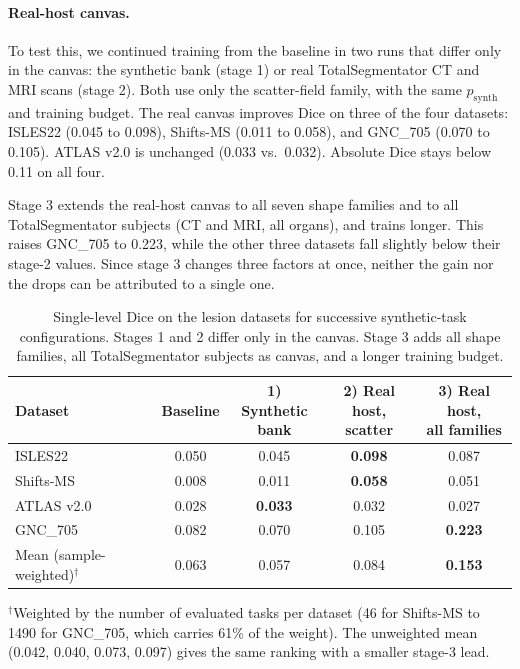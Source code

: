 \documentclass[hidelinks, a4paper, 12pt, ngerman, english]{article}  %
\begin{document}
\paragraph{Real-host canvas.}
To test this, we continued training from the baseline in two runs that differ
only in the canvas: the synthetic bank (stage 1) or real TotalSegmentator
CT and MRI scans (stage 2). Both use only the scatter-field family, with the same
$p_\text{synth}$ and training budget. The real canvas improves Dice on three of
the four datasets: ISLES22 (0.045 to 0.098), Shifts-MS (0.011 to 0.058), and
GNC\_705 (0.070 to 0.105). ATLAS v2.0 is unchanged (0.033 vs.\ 0.032).
Absolute Dice stays below 0.11 on all four.

Stage 3 extends the real-host canvas to all seven shape families and to all
TotalSegmentator subjects (CT and MRI, all organs), and trains longer. This
raises GNC\_705 to 0.223, while the other three datasets fall slightly below
their stage-2 values. Since stage 3 changes three factors at once, neither the
gain nor the drops can be attributed to a single one.

\begin{table}[t]
  \centering
  \small
  \caption{Single-level Dice on the lesion datasets for successive
  synthetic-task configurations. Stages 1 and 2 differ only in the canvas.
  Stage 3 adds all shape families, all TotalSegmentator subjects as canvas,
  and a longer training budget.}
  \label{tab:synth-realhost-ood}
  \begin{tabular}{@{}lcccc@{}}
    \toprule
    Dataset & Baseline & \makecell{1) Synthetic\\bank} & \makecell{2) Real host,\\scatter} & \makecell{3) Real host,\\all families} \\
    \midrule
    ISLES22    & 0.050 & 0.045 & \textbf{0.098} & 0.087 \\
    Shifts-MS  & 0.008 & 0.011 & \textbf{0.058} & 0.051 \\
    ATLAS v2.0 & 0.028 & \textbf{0.033} & 0.032 & 0.027 \\
    GNC\_705   & 0.082 & 0.070 & 0.105 & \textbf{0.223} \\
    \midrule
    Mean (sample-weighted)$^{\dagger}$ & 0.063 & 0.057 & 0.084 & \textbf{0.153} \\
    \bottomrule
  \end{tabular}
  \par\vspace{0.5em}
  \raggedright\footnotesize
  $^{\dagger}$Weighted by the number of evaluated tasks per dataset (46 for
  Shifts-MS to 1490 for GNC\_705, which carries 61\% of the weight). The
  unweighted mean (0.042, 0.040, 0.073, 0.097) gives the same ranking with a
  smaller stage-3 lead.
\end{table}
\end{document}
